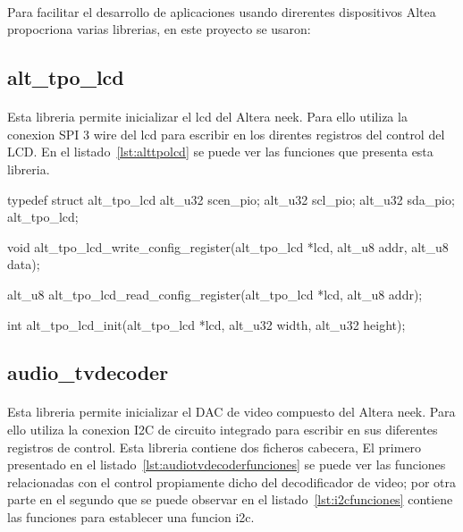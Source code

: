 \documentclass[a4paper,12pt,titlepage,final]{book}
\begin{document}
\paragraph{}
Para facilitar el desarrollo de aplicaciones usando direrentes dispositivos Altea propocriona varias librerias, en este proyecto se usaron:
\subsection{alt\_tpo\_lcd}
\paragraph{}
Esta libreria permite inicializar el lcd del Altera neek. Para ello utiliza la conexion SPI 3 wire del lcd para escribir en los direntes registros del control del LCD. En el listado~\ref{lst:alttpolcd} se puede ver las funciones que presenta esta libreria.



typedef struct alt_tpo_lcd
{
  alt_u32 scen_pio;
  alt_u32 scl_pio;
  alt_u32 sda_pio;
} alt_tpo_lcd;

void alt_tpo_lcd_write_config_register(alt_tpo_lcd *lcd, alt_u8 addr, alt_u8 data);
                                       
alt_u8 alt_tpo_lcd_read_config_register(alt_tpo_lcd *lcd, alt_u8 addr);

int alt_tpo_lcd_init(alt_tpo_lcd *lcd, alt_u32 width, alt_u32 height);

\subsection{audio\_tvdecoder}
\paragraph{}
Esta libreria permite inicializar el DAC de video compuesto del Altera neek. Para ello utiliza la conexion I2C de circuito integrado para escribir en sus diferentes registros de control. Esta libreria contiene dos ficheros cabecera, El primero presentado en el listado~\ref{lst:audiotvdecoderfunciones} se puede ver las funciones relacionadas con el control propiamente dicho del decodificador de video; por otra parte en el segundo que se puede observar en el listado~\ref{lst:i2cfunciones} contiene las funciones para establecer una funcion i2c.
\end{document}
